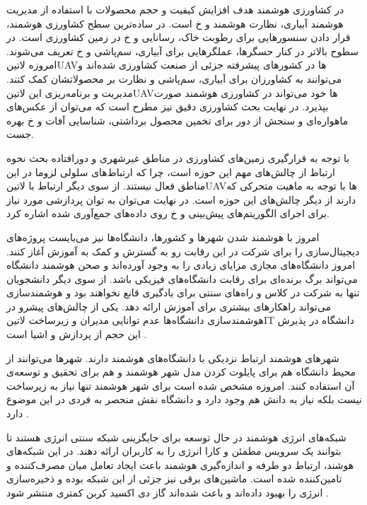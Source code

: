

در کشاورزی هوشمند هدف افزایش کیفیت و حجم محصولات با استفاده از مدیریت هوشمند آبیاری، نظارت هوشمند و ‌خ است.
در ساده‌ترین سطح کشاورزی هوشمند، قرار دادن سنسورهایی برای رطوبت خاک، رسانایی و ‌خ در زمین کشاورزی است. در سطوح بالاتر در کنار حسگرها، عملگرهایی برای آبیاری، سم‌پاشی و ‌خ تعریف می‌شوند.
امروزه ‌لاتین{UAV}ها در کشورهای پیشرفته جزئی از صنعت کشاورزی شده‌اند و می‌توانند به کشاورزان برای آبیاری، سم‌پاشی و نظارت بر محصولاتشان کمک کنند. مدیریت و برنامه‌ریزی این ‌لاتین{UAV}ها خود می‌تواند
در کشاورزی هوشمند صورت بپذیرد. در نهایت بحث کشاورزی دقیق نیز مطرح است که می‌توان از عکس‌های ماهواره‌ای و سنجش از دور برای تخمین محصول برداشتی، شناسایی آفات و ‌خ بهره جست.

با توجه به قرارگیری زمین‌های کشاورزی در مناطق غیرشهری و دورافتاده بحث نحوه ارتباط از چالش‌های مهم این حوزه است، چرا که ارتباط‌های سلولی لزوما در این مناطق فعال نیستند.
از سوی دیگر ارتباط با ‌لاتین{UAV}ها با توجه به ماهیت متحرکی که دارند از دیگر چالش‌های این حوزه است. در نهایت می‌توان به توان پردازشی مورد نیاز برای اجرای الگوریتم‌های پیش‌بینی
و ‌خ روی داده‌های جمع‌آوری شده اشاره کرد.


امروز با هوشمند شدن شهرها و کشورها، دانشگاه‌ها نیز می‌بایست پروژه‌های دیجیتال‌سازی را برای شرکت در این رقابت رو به گسترش و کمک به آموزش آغاز کنند.
امروز دانشگاه‌های مجازی مزایای زیادی را به وجود آورده‌اند و صحن هوشمند دانشگاه می‌تواند برگ برنده‌ای برای رقابت دانشگاه‌های فیزیکی باشد. از سوی دیگر دانشجویان تنها به شرکت در کلاس و راه‌های سنتی
برای یادگیری قانع نخواهند بود و هوشمندسازی می‌تواند راهکارهای بیشتری برای آموزش ارائه دهد.
یکی از چالش‌های پیشرو در هوشمندسازی دانشگاه‌ها عدم توانایی مدیران و زیرساخت ‌لاتین{IT} دانشگاه در پذیرش این حجم از پردازش و اشیا است
.

شهرهای هوشمند ارتباط نزدیکی با دانشگاه‌های هوشمند دارند. شهرها می‌توانند از محیط دانشگاه هم برای پایلوت کردن مدل شهر هوشمند و هم برای تحقیق و توسعه‌ی آن استفاده کنند.
امروزه مشخص شده است برای شهر هوشمند تنها نیاز به زیرساخت نیست بلکه نیاز به دانش هم وجود دارد و دانشگاه نقش منحصر به فردی در این موضوع دارد
.


شبکه‌های انرژی هوشمند در حال توسعه برای جایگزینی شبکه سنتی انرژی هستند تا بتوانند یک سرویس مطمئن و کارا انرژی را به کاربران ارائه دهند.
در این شبکه‌های هوشند، ارتباط دو طرفه و اندازه‌گیری هوشمند باعث ایجاد تعامل میان مصرف‌کننده و تامین‌کننده شده است. ماشین‌های برقی
نیز جزئی از این شبکه بوده و ذخیره‌سازی انرژی را بهبود داده‌اند
و باعث شده‌اند گاز دی اکسید کربن کمتری منتشر شود
.

